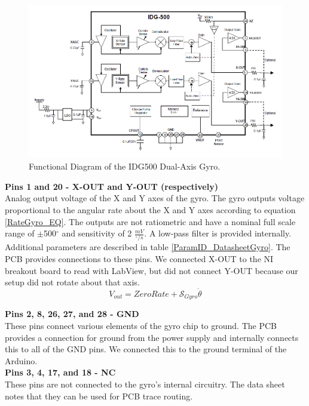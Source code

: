 \documentclass{article}
\theoremstyle{plain}
\theoremstyle{definition}
\theoremstyle{remark}
\newcommand{\Sens}{\mathcal{S}}
\begin{document}
\begin{figure}[hbt]
\begin{center}
\includegraphics[width = 16cm]{IDG500Functional.png}
\caption{Functional Diagram of the IDG500 Dual-Axis Gyro.}
\label{gyroFunc}
\end{center}
\end{figure}

\textbf{Pins 1 and 20 - X-OUT and Y-OUT (respectively)}\\
Analog output voltage of the X and Y axes of the gyro. The gyro outputs voltage proportional to the angular rate about the X and Y axes according to equation \ref{RateGyro_EQ}. The outputs are not ratiometric and have a nominal full scale range of $\pm$500$^{\circ}$ and sensitivity of 2 $\frac{mV}{^{\circ}/s}$.  A low-pass filter is provided internally.  Additional parameters are described in table \ref{ParamID_DatasheetGyro}.  The PCB provides connections to these pins. We connected X-OUT to the NI breakout board to read with LabView, but did not connect Y-OUT because our setup did not rotate about that axis.\\

\begin{equation}
V_{out} = ZeroRate + \Sens_{Gyro} \dot{\theta} 
\label{RateGyro_EQ}
\end{equation}


\textbf{Pins 2, 8, 26, 27, and 28 - GND}\\
These pins connect various elements of the gyro chip to ground. The PCB provides a connection for ground from the power supply and internally connects this to all of the GND pins. We connected this to the ground terminal of the Arduino.\\

\textbf{Pins 3, 4, 17, and 18 - NC}\\
These pins are not connected to the gyro's internal circuitry. The data sheet notes that they can be used for PCB trace routing.\\
\end{document}
